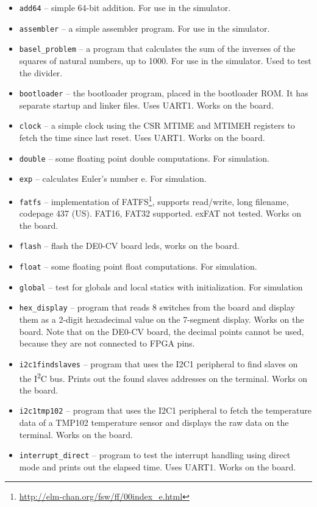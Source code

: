 \documentclass[12pt]{article}
\begin{document}
\begin{itemize}
\item \lstinline|add64| -- simple 64-bit addition. For use in the simulator.
\item \lstinline|assembler| -- a simple assembler program. For use in the simulator.
\item \lstinline|basel_problem| -- a program that calculates the sum of the inverses of the squares of natural numbers, up to 1000. For use in the simulator. Used to test the divider.
\item \lstinline|bootloader| -- the bootloader program, placed in the bootloader ROM. It has separate startup and linker files. Uses UART1. Works on the board.
\item \lstinline|clock| -- a simple clock using the CSR MTIME and MTIMEH registers to fetch the time since last reset. Uses UART1. Works on the board.
\item \lstinline|double| -- some floating point double computations. For simulation.
\item \lstinline|exp| -- calculates Euler's number e. For simulation.
\item \lstinline|fatfs| -- implementation of FATFS\footnote{\url{http://elm-chan.org/fsw/ff/00index_e.html}}, supports read/write, long filename, codepage 437 (US). FAT16, FAT32 supported. exFAT not tested. Works on the board.
\item \lstinline|flash| -- flash the DE0-CV board leds, works on the board.
\item \lstinline|float| -- some floating point float computations. For simulation.
\item \lstinline|global| -- test for globals and local statics with initialization. For simulation
\item \lstinline|hex_display| -- program that reads 8 switches from the board and display them as a 2-digit hexadecimal value on the 7-segment display. Works on the board. Note that on the DE0-CV board, the decimal points cannot be used, because they are not connected to FPGA pins.
\item \lstinline|i2c1findslaves| -- program that uses the I2C1 peripheral to find slaves on the I\textsuperscript{2}C bus. Prints out the found slaves addresses on the terminal. Works on the board.
\item \lstinline|i2c1tmp102| -- program that uses the I2C1 peripheral to fetch the temperature data of a TMP102 temperature sensor and displays the raw data on the terminal. Works on the board.
\item \lstinline|interrupt_direct| -- program to test the interrupt handling using direct mode and prints out the elapsed time. Uses UART1. Works on the board.

\end{itemize}
\end{document}
